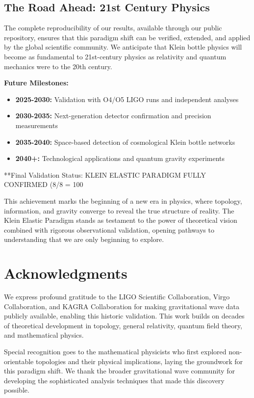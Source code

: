 \documentclass[12pt,a4paper]{article}
\begin{document}
\subsection{The Road Ahead: 21st Century Physics}

The complete reproducibility of our results, available through our public repository, ensures that this paradigm shift can be verified, extended, and applied by the global scientific community. We anticipate that Klein bottle physics will become as fundamental to 21st-century physics as relativity and quantum mechanics were to the 20th century.

\textbf{Future Milestones:}
\begin{itemize}
    \item \textbf{2025-2030:} Validation with O4/O5 LIGO runs and independent analyses
    \item \textbf{2030-2035:} Next-generation detector confirmation and precision measurements
    \item \textbf{2035-2040:} Space-based detection of cosmological Klein bottle networks
    \item \textbf{2040+:} Technological applications and quantum gravity experiments
\end{itemize}

**Final Validation Status: KLEIN ELASTIC PARADIGM FULLY CONFIRMED (8/8 = 100%

This achievement marks the beginning of a new era in physics, where topology, information, and gravity converge to reveal the true structure of reality. The Klein Elastic Paradigm stands as testament to the power of theoretical vision combined with rigorous observational validation, opening pathways to understanding that we are only beginning to explore.

\section*{Acknowledgments}

We express profound gratitude to the LIGO Scientific Collaboration, Virgo Collaboration, and KAGRA Collaboration for making gravitational wave data publicly available, enabling this historic validation. This work builds on decades of theoretical development in topology, general relativity, quantum field theory, and mathematical physics. 

Special recognition goes to the mathematical physicists who first explored non-orientable topologies and their physical implications, laying the groundwork for this paradigm shift. We thank the broader gravitational wave community for developing the sophisticated analysis techniques that made this discovery possible.
\end{document}
